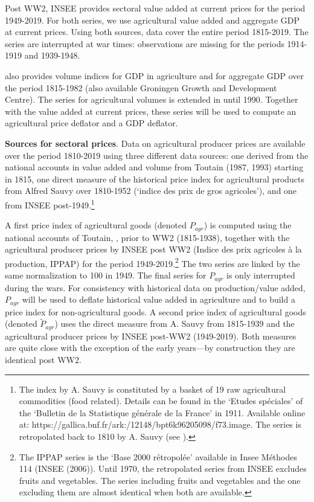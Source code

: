 \documentclass[11pt]{report}
\begin{document}
Post WW2, INSEE provides sectoral value added at current prices for the period 1949-2019. For both series, we use agricultural value added and aggregate GDP at current prices. Using both sources, data cover the entire period 1815-2019. The series are interrupted at war times: observations are missing for the periods 1914-1919 and 1939-1948. 

\cite{toutain1987produit} also provides volume indices for GDP in agriculture and for aggregate GDP over the period 1815-1982 (also available Groningen Growth and Development Centre). The series for agricultural volumes is extended in \cite{toutain1993production} until 1990. Together with the value added at current prices, these series will be used to compute an agricultural price deflator and a GDP deflator.

\noindent \textbf{Sources for sectoral prices}. Data on agricultural producer prices are available over the period 1810-2019 using three different data sources: one derived from the national accounts in value added and volume from Toutain (1987, 1993) starting in 1815, one direct measure of the historical price index for agricultural products from Alfred Sauvy over 1810-1952 (`indice des prix de gros agricoles'), and one from INSEE post-1949.\footnote{The index by A. Sauvy is constituted by a basket of 19 raw agricultural commodities (food related). Details can be found in the `Etudes spéciales' of the `Bulletin de la Statistique générale de la France' in 1911. Available online at: https://gallica.bnf.fr/ark:/12148/bpt6k96205098/f73.image. The series is retropolated back to 1810 by A. Sauvy (see \cite{sauvy1952variations}).}

A first price index of agricultural goods (denoted $P_{agr}$) is computed using the national accounts of Toutain, \cite{toutain1993production}, prior to WW2 (1815-1938), together with the agricultural producer prices by INSEE post WW2 (Indice des prix agricoles à la production, IPPAP) for the period 1949-2019.\footnote{The IPPAP series is the `Base 2000 rétropolée' available in Insee Méthodes 114 (INSEE (2006)). Until 1970, the retropolated series from INSEE excludes fruits and vegetables. The series including fruits and vegetables and the one excluding them are almost identical when both are available.} The two series are linked by the same normalization to 100 in 1949. The final series for $P_{agr}$ is only interrupted during the wars. For consistency with historical data on production/value added, $P_{agr}$ will be used to deflate historical value added in agriculture and to build a price index for non-agricultural goods. A second price index of agricultural goods (denoted $\tilde{P}_{agr}$) uses the direct measure from A. Sauvy from 1815-1939 and the agricultural producer prices by INSEE post-WW2 (1949-2019). Both measures are quite close with the exception of the early years---by construction they are identical post WW2. 
\end{document}
